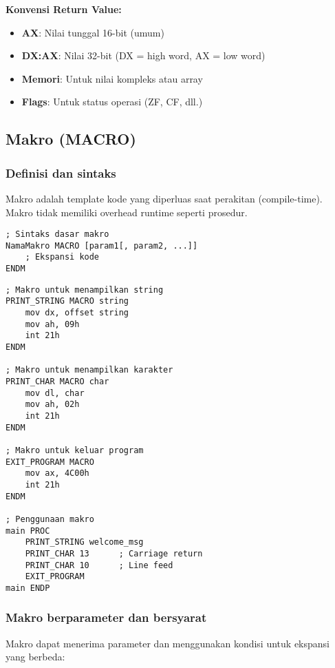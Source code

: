 \documentclass[../main.tex]{subfiles}
\begin{document}
                \textbf{Konvensi Return Value:}
                \begin{itemize}
                    \item \textbf{AX}: Nilai tunggal 16-bit (umum)
                    \item \textbf{DX:AX}: Nilai 32-bit (DX = high word, AX = low word)
                    \item \textbf{Memori}: Untuk nilai kompleks atau array
                    \item \textbf{Flags}: Untuk status operasi (ZF, CF, dll.)
                \end{itemize}

        \subsection{Makro (MACRO)}
            \subsubsection{Definisi dan sintaks}
                Makro adalah template kode yang diperluas saat perakitan (compile-time). Makro tidak memiliki overhead runtime seperti prosedur.

                \begin{lstlisting}[language={[x86masm]Assembler}, caption=Sintaks Makro Dasar, label={lst:macro-syntax}]
; Sintaks dasar makro
NamaMakro MACRO [param1[, param2, ...]]
    ; Ekspansi kode
ENDM
                \end{lstlisting}

                \begin{lstlisting}[language={[x86masm]Assembler}, caption=Contoh Makro Sederhana, label={lst:simple-macro}]
; Makro untuk menampilkan string
PRINT_STRING MACRO string
    mov dx, offset string
    mov ah, 09h
    int 21h
ENDM

; Makro untuk menampilkan karakter
PRINT_CHAR MACRO char
    mov dl, char
    mov ah, 02h
    int 21h
ENDM

; Makro untuk keluar program
EXIT_PROGRAM MACRO
    mov ax, 4C00h
    int 21h
ENDM

; Penggunaan makro
main PROC
    PRINT_STRING welcome_msg
    PRINT_CHAR 13      ; Carriage return
    PRINT_CHAR 10      ; Line feed
    EXIT_PROGRAM
main ENDP
                \end{lstlisting}

            \subsubsection{Makro berparameter dan bersyarat}
                Makro dapat menerima parameter dan menggunakan kondisi untuk ekspansi yang berbeda:
\end{document}
